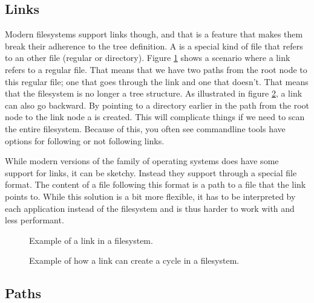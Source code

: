 \subsection{Links}

Modern filesystems support links though, and that is a feature that makes them break their adherence to the tree definition. A  is a special kind of file that refers to an other file (regular or directory). Figure \ref{fig:bs:fs:links} shows a scenario where a link refers to a regular file. That means that we have two paths from the root node to this regular file; one that goes through the link and one that doesn't. That means that the filesystem is no longer a tree structure. As illustrated in figure \ref{fig:bs:fs:cycles}, a link can also go backward. By pointing to a directory earlier in the path from the root node to the link node a  is created. This will complicate things if we need to scan the entire filesystem. Because of this, you often see commandline tools have options for following or not following links.

While modern versions of the  family of operating systems does have some support for links, it can be sketchy. Instead they support  through a special  file format. The content of a file following this format is a path to a file that the link points to. While this solution is a bit more flexible, it has to be interpreted by each application instead of the filesystem and is thus harder to work with and less performant.

\begin{figure}[tbp]
	
	\caption{Example of a link in a filesystem.}
	\label{fig:bs:fs:links}
\end{figure}

\begin{figure}[tbp]
	
	\caption{Example of how a link can create a cycle in a filesystem.}
	\label{fig:bs:fs:cycles}
\end{figure}

\subsection{Paths}

